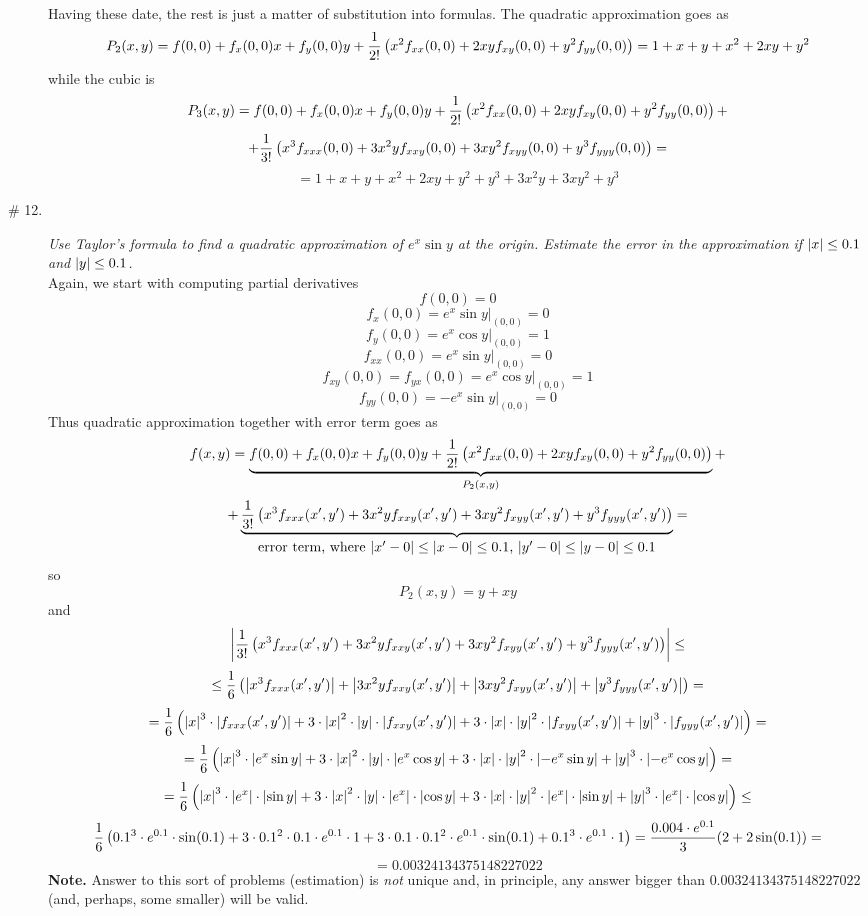 \documentclass[8pt]{article} %
\begin{document}
\begin{description}
{		Having these date, the rest is just a matter of substitution into formulas. The quadratic approximation goes as
		\[P_2(x,y)=f(0,0)+f_x(0,0)x+f_y(0,0)y+\frac{1}{2!}\left(x^2f_{xx}(0,0)+2xyf_{xy}(0,0)+y^2f_{yy}(0,0)\right)=1+x+y+x^2+2xy+y^2\]
		while the cubic is
		\[P_3(x,y)=f(0,0)+f_x(0,0)x+f_y(0,0)y+\frac{1}{2!}\left(x^2f_{xx}(0,0)+2xyf_{xy}(0,0)+y^2f_{yy}(0,0)\right)+\]\[+
		\frac{1}{3!}\left(x^3f_{xxx}(0,0)+3x^2yf_{xxy}(0,0)+3xy^2f_{xyy}(0,0)+y^3f_{yyy}(0,0)\right)=\]
		\[=1+x+y+x^2+2xy+y^2+y^3+3x^2y+3xy^2+y^3\]
		}
	\item[\# 12.]{{\it Use Taylor's formula to find a quadratic approximation of $e^x\sin y$ at the origin. Estimate the error in the 
		approximation if $\left|x\right|\leq 0.1$ and $\left|y\right|\leq 0.1$.}\\
		Again, we start with computing partial derivatives
		\[f(0,0)=0\]
		\[f_x(0,0)=e^x\sin y\bigg|_{(0,0)}=0\]
		\[f_y(0,0)=e^x\cos y\bigg|_{(0,0)}=1\]
		\[f_{xx}(0,0)=e^x\sin y\bigg|_{(0,0)}=0\]
		\[f_{xy}(0,0)=f_{yx}(0,0)=e^x\cos y\bigg|_{(0,0)}=1\]
		\[f_{yy}(0,0)=-e^x\sin y\bigg|_{(0,0)}=0\]
		}
		Thus quadratic approximation together with error term goes as
		\[f(x,y)=\underbrace{f(0,0)+f_x(0,0)x+f_y(0,0)y+\frac{1}{2!}\left(x^2f_{xx}(0,0)+2xyf_{xy}(0,0)+y^2f_{yy}(0,0)\right)}_{P_2(x,y)}+\]
		\[+\underbrace{\frac{1}{3!}\left(x^3f_{xxx}(x',y')+3x^2yf_{xxy}(x',y')+3xy^2f_{xyy}(x',y')+y^3f_{yyy}(x',y')\right)
		}_{\mbox{error term, where $\left|x'-0\right|\leq\left|x-0\right|\leq 0.1$, $\left|y'-0\right|\leq\left|y-0\right|\leq 0.1$}}=\]
		so \[P_2(x,y)=y+xy\]
		and \[\left|\frac{1}{3!}\left(x^3f_{xxx}(x',y')+3x^2yf_{xxy}(x',y')+3xy^2f_{xyy}(x',y')+y^3f_{yyy}(x',y')\right)\right|\leq\]
		\[\leq \frac{1}{6}\left(
		\left|x^3f_{xxx}(x',y')\right|+\left|3x^2yf_{xxy}(x',y')\right|+\left|3xy^2f_{xyy}(x',y')\right|+\left|y^3f_{yyy}(x',y')\right|\right)=\]
		\[=\frac{1}{6}\left(
		\left|x\right|^3\cdot\left|f_{xxx}(x',y')\right|+
		3\cdot\left|x\right|^2\cdot\left|y\right|\cdot\left|f_{xxy}(x',y')\right|+
		3\cdot\left|x\right|\cdot\left|y\right|^2\cdot\left|f_{xyy}(x',y')\right|+
		\left|y\right|^3\cdot\left|f_{yyy}(x',y')\right|\right)=
		\]
		\[=\frac{1}{6}\left(\left|x\right|^3\cdot\left|e^x\sin y\right|+
		3\cdot\left|x\right|^2\cdot\left|y\right|\cdot\left|e^x\cos y\right|+
		3\cdot\left|x\right|\cdot\left|y\right|^2\cdot\left|-e^x\sin y\right|+
		\left|y\right|^3\cdot\left|-e^x\cos y\right|\right)=\]
		\[=\frac{1}{6}\left(\left|x\right|^3\cdot\left|e^x\right|\cdot\left|\sin y\right|+
		3\cdot\left|x\right|^2\cdot\left|y\right|\cdot\left|e^x\right|\cdot\left|\cos y\right|+
		3\cdot\left|x\right|\cdot\left|y\right|^2\cdot\left|e^x\right|\cdot\left|\sin y\right|+
		\left|y\right|^3\cdot\left|e^x\right|\cdot\left|\cos y\right|\right)\leq\]
		\[\frac{1}{6}\left(0.1^3\cdot e^{0.1}\cdot\sin(0.1)+3\cdot 0.1^2\cdot 0.1\cdot e^{0.1}\cdot1+
		3\cdot 0.1\cdot0.1^2\cdot e^{0.1}\cdot\sin(0.1)+0.1^3\cdot e^{0.1}\cdot 1\right)=\frac{0.004\cdot e^{0.1}}{3}(2+2\sin(0.1))=
		\]\[=0.00324134375148227022\]
		\textbf{Note. } Answer to this sort of problems (estimation) is \textit{not} unique and, in principle, any answer
		bigger than $0.00324134375148227022$ (and, perhaps, some smaller) will be valid.

\end{description}
\end{document}

